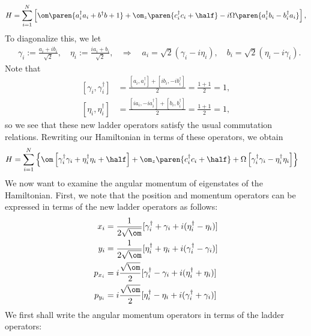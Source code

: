 \documentclass{article}
\begin{document}
$$
\begin{aligned}
H
&= \sum_{i=1}^N \left[\om\paren{a_i^\dagger a_i + b^\dagger b + 1} +  \om_z\paren{c_i^\dagger c_i + \half} - i\Omega\paren{a_i^\dagger b_i - b_i^\dagger a_i}\right],\\
\end{aligned}
$$
To diagonalize this, we let
$$
\begin{aligned}
&\gamma_i := \frac{a_i + i b_i}{\sqrt{2}}, \quad \eta_i := \frac{i a_i + b_i}{\sqrt{2}},
&\Rightarrow\quad a_i = \sqrt{2}(\gamma_i - i \eta_i), \quad b_i = \sqrt{2}(\eta_i - i \gamma_i).
\end{aligned}
$$
Note that
$$
\begin{aligned}
\left[\gamma_i,\gamma_i^\dagger\right] &=
  \frac{\left[a_i,a_i^\dagger\right] +
  \left[ib_i,-ib_i^\dagger\right]}{2} = \frac{1+1}{2} = 1,\\
\left[\eta_i,\eta_i^\dagger\right] &=
  \frac{\left[i a_i,-i a_i^\dagger\right] +
  \left[b_i,b_i^\dagger\right]}{2} = \frac{1+1}{2} = 1,
\end{aligned}
$$
so we see that these new ladder operators satisfy the usual
commutation relations.  Rewriting our Hamiltonian in terms of these
operators, we obtain
$$
\begin{aligned}
H
&=  \sum_{i=1}^N \left\{\om\left[\gamma_i^\dagger\gamma_i + \eta_i^\dagger\eta_i + \half\right] + \om_z\paren{c_i^\dagger c_i + \half}+ \Omega\left[\gamma_i^\dagger\gamma_i - \eta_i^\dagger\eta_i\right]\right\}
\end{aligned}
$$
We now want to examine the angular momentum of eigenstates of the Hamiltonian.
First, we note that the position and momentum operators can be expressed in terms of the new ladder operators as follows:
$$
\begin{aligned}[]
x_i &= \frac{1}{2\sqrt{\om}}[\gamma_i^\dagger + \gamma_i+ i(\eta_i^\dagger-\eta_i)]\\
y_i &= \frac{1}{2\sqrt{\om}}[\eta_i^\dagger + \eta_i+ i(\gamma_i^\dagger-\gamma_i)]\\
p_{x_i} &= i\frac{\sqrt{\om}}{2}[\gamma_i^\dagger - \gamma_i + i(\eta_i^\dagger + \eta_i)]\\
p_{y_i} &=i\frac{\sqrt{\om}}{2}[\eta_i^\dagger - \eta_i + i(\gamma_i^\dagger + \gamma_i)]\\
\end{aligned}
$$
We first shall write the angular momentum operators in terms of the ladder operators:
\end{document}
